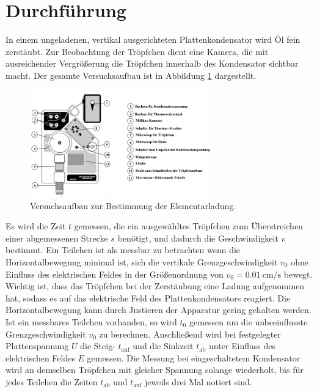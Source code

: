 \section{Durchf\"uhrung}
\label{sec:Durchfuehrung}
In einem ungeladenen, vertikal ausgerichteten Plattenkondensator wird Öl fein zerstäubt.
Zur Beobachtung der Tröpfchen dient eine Kamera, die mit ausreichender Vergrößerung die Tröpfchen innerhalb des Kondensator sichtbar macht. Der gesamte Versuchsaufbau ist in Abbildung \ref{fig:aufbau} dargestellt.
\begin{figure}
	\centering
	\includegraphics[width=0.7\textwidth]{Bilder/aufbau.pdf}
	\caption{Versuchsaufbau zur Bestimmung der Elementarladung.\cite{skript}}
	\label{fig:aufbau}
\end{figure}
Es wird die Zeit $t$ gemessen, die ein ausgewähltes Tröpfchen zum Überstreichen einer abgemessenen Strecke $s$ benötigt, und  dadurch die Geschwindigkeit $v$ bestimmt.
Ein Teilchen ist als messbar zu betrachten wenn die Horizontalbewegung minimal ist, 
sich die vertikale Grenzgeschwindigkeit $v_0$ ohne Einfluss des elektrischen Feldes in der Größenordnung von $v_0=\SI{0.01}{\centi\meter\per\second}$ bewegt. 
Wichtig ist, dass das Tröpfchen bei der Zerstäubung eine Ladung aufgenommen hat, sodass es auf das elektrische Feld des Plattenkondensators reagiert. Die Horizontalbewegung kann durch Justieren der Apparatur gering gehalten werden.\\
Ist ein messbares Teilchen vorhanden, so wird $t_0$ gemessen um die unbeeinflusste Grenzgeschwindigkeit $v_0$ zu berechnen. 
Anschließend wird bei festgelegter Plattenspannung $U$ die Steig- $t_\text{auf}$ und die Sinkzeit $t_\text{ab}$ unter Einfluss des elektrischen Feldes $E$ gemessen.
Die Messung bei eingeschaltetem Kondensator wird an demselben Tröpfchen mit gleicher Spannung solange wiederholt, bis für jedes Teilchen die Zeiten $t_\text{ab}$ und $t_\text{auf}$ jeweils drei Mal notiert sind.
